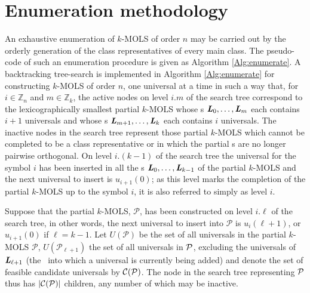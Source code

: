 \section{Enumeration methodology}
An exhaustive enumeration of   $k$-MOLS of order $n$ may be carried out by    the orderly generation of the class representatives of every main class. The pseudo-code of such an enumeration procedure is given as Algorithm \ref{Alg:enumerate}.
A backtracking tree-search is implemented in Algorithm \ref{Alg:enumerate} for  constructing $k$-MOLS of order $n$,  one universal at a time in such a way that,
 for $i \in \mathbb{Z}_n$ and $m \in \mathbb{Z}_k$, the active nodes on level $i.m$  of the search tree correspond to the lexicographically smallest partial $k$-MOLS whose \lat s $\mbox{\bf \emph{L}}_0, \ldots, \mbox{\bf \emph{L}}_{m}$ each contains $i+1$
universals and whose \lat s $\mbox{\bf \emph{L}}_{m+1}, \ldots, \mbox{\bf \emph{L}}_{k}$ each contains $i$ universals.  The inactive nodes in the search tree represent  those partial $k$-MOLS which cannot be completed to be a  class representative  or in which the partial \lat s are no longer pairwise orthogonal. On level $i.(k\!-\!1)$  of the search tree the  universal for the symbol $i$ has been inserted in all the \lat s $\mbox{\bf \emph{L}}_0, \ldots, \mbox{\bf \emph{L}}_{k-1}$ of the partial $k$-MOLS  and the next universal to insert is $u_{i+1}{(0)}$; as this level marks the completion of the partial $k$-MOLS up to the symbol $i$, it is also referred to simply as level $i$.
 \begin{algorithm}[!b]
 \BlankLine
{}	
\caption{enumerateMOLS($\p$) \label{Alg:enumerate}%
}
\end{algorithm}


Suppose that the partial $k$-MOLS, $\mathcal{P}$, has been constructed on level $i.\ell$ of the search tree, in other words, the next universal to insert into $\mathcal{P}$ is   $u_i{(\ell+1)}$, or  $u_{i+1}{(0)}$ if $\ell = k-1$.   Let $U(\mathcal{P})$ be the set of all universals in the partial $k$-MOLS $\mathcal{P}$, $U(\mathcal{P}_{\ell+1})$ the set of  all universals in $\p$, excluding the universals of $\mbox{\bf \emph{L}}_{\ell+1}$ (the \lat \ into which a universal is currently being added) and denote the set of feasible candidate universals by $\mathcal{C}(\mathcal{P})$.  The node in the search tree representing $\p$ thus has $|\mathcal{C}(\mathcal{P})|$  children, any number of which may be inactive. %

